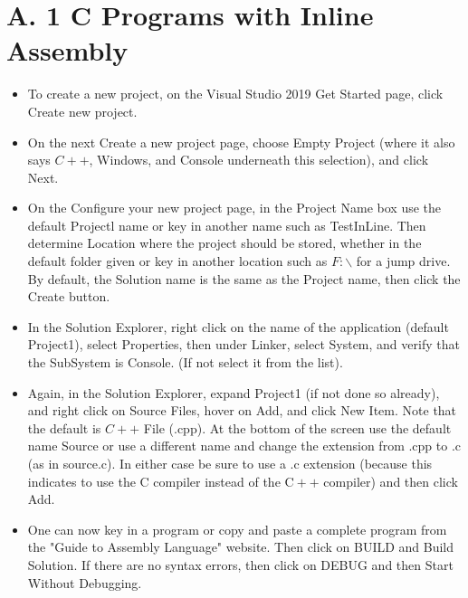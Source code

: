 \documentclass[10pt]{article}
\begin{document}
\section*{A. 1 C Programs with Inline Assembly}
\begin{itemize}
  \item To create a new project, on the Visual Studio 2019 Get Started page, click Create new project.
  \item On the next Create a new project page, choose Empty Project (where it also says $C++$, Windows, and Console underneath this selection), and click Next.
  \item On the Configure your new project page, in the Project Name box use the default Projectl name or key in another name such as TestInLine. Then determine Location where the project should be stored, whether in the default folder given or key in another location such as $F: \backslash$ for a jump drive. By default, the Solution name is the same as the Project name, then click the Create button.
  \item In the Solution Explorer, right click on the name of the application (default Project1), select Properties, then under Linker, select System, and verify that the SubSystem is Console. (If not select it from the list).
  \item Again, in the Solution Explorer, expand Project1 (if not done so already), and right click on Source Files, hover on Add, and click New Item. Note that the default is $C++$ File (.cpp). At the bottom of the screen use the default name Source or use a different name and change the extension from .cpp to .c (as in source.c). In either case be sure to use a .c extension (because this indicates to use the C compiler instead of the $\mathrm{C}++$ compiler) and then click Add.
  \item One can now key in a program or copy and paste a complete program from the "Guide to Assembly Language" website. Then click on BUILD and Build Solution. If there are no syntax errors, then click on DEBUG and then Start Without Debugging.
\end{itemize}
\end{document}
